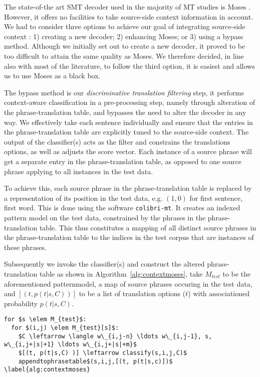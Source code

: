 \documentclass[11pt]{article}
\begin{document}
The state-of-the art SMT decoder used in the majority of MT studies is Moses
\citep{MOSES}. However, it offers no facilities to take source-side context
information in account. We had to consider three options to achieve our goal of
integrating source-side context : 1) creating a new decoder; 2) enhancing
Moses; or 3) using a bypass method. Although we initially set out to create a
new decoder, it proved to be too difficult to attain the same quality as Moses.
We therefore decided, in line also with most of the literature, to follow the
third option, it is easiest and allows us to use Moses as a black box.

The bypass method is our \emph{discriminative translation filtering}
\cite{Rejwanuk_11} step, it performs context-aware classification in a
pre-processing step, namely through alteration of the phrase-translation table,
and bypasses the need to alter the decoder in any way. We effectively take each
sentence individually and ensure that the entries in the phrase-translation
table are explicitly tuned to the source-side context. The output of the
classifier(s) acts as the filter and constrains the translations options, as
well as adjusts the score vector. Each instance of a source phrase will get a
separate entry in the phrase-translation table, as opposed to one source phrase
applying to all instances in the test data. 

To achieve this, each source phrase in the phrase-translation table is replaced
by a representation of its position in the test data, e.g.  $(1,0)$ for first
sentence, first word.  This is done using the software \texttt{colibri-mt}. It
creates an indexed pattern model on the test data, constrained by the phrases
in the phrase-translation table. This thus constitutes a mapping of all distinct
source phrases in the phrase-translation table to the indices in the test
corpus that are instances of these phrases.

Subsequently we invoke the classifier(s) and construct the altered
phrase-translation table as shown in Algorithm~\ref{alg:contextmoses}, take $M_{test}$ to be the aforementioned patternmodel, a map of source phrases occuring in the test
data, and $[(t,p(t|s,C))]$ to be a list of translation options ($t$) with
associationed probability $p(t|s,C)$.

\begin{lstlisting}
for $s \elem M_{test}$:
  for $(i,j) \elem M_{test}[s]$:
    $C \leftarrow \langle w\_{i,j-n} \ldots w\_{i,j-1}, s, w\_{i,j+|s|+1} \ldots w\_{i,j+|s|+m}$
    $[(t, p(t|s,C) )] \leftarrow classify(s,i,j,C)$
    appendtophrasetable$(s,i,j,[(t, p(t|s,c)])$
\label{alg:contextmoses}
\end{lstlisting}
\end{document}
